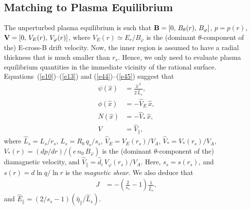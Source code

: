 \documentclass[12pt,prb,aps,notitlepage]{revtex4-1}
\begin{document}
\subsection{Matching to Plasma Equilibrium}
The unperturbed plasma equilibrium is such that
${\bf B} = [0,\,B_\theta(r),\,B_\varphi]$,  $p = p(r)$,
${\bf V} = [0,\,V_E(r),\,V_\varphi(r)]$,
where 
$V_E(r)\simeq E_r/B_\varphi$
 is the (dominant $\theta$-component of the) E-cross-B drift velocity. Now, the inner region is assumed to have a radial thickness that is
much smaller than $r_s$.   Hence, we only need to evaluate plasma equilibrium quantities in the immediate vicinity of the rational
surface. Equations~(\ref{e10})--(\ref{e13}) and (\ref{e44})--(\ref{e45}) suggest that 
\begin{align}
\psi(\hat{x})&= \frac{\hat{x}^{\,2}}{2\,\hat{L}_s},\label{e23}\\[0.5ex]
\phi(\hat{x}) &= - \hat{V}_E\,\hat{x},\\[0.5ex]
N(\hat{x}) &= -\hat{V}_\ast\,\hat{x},\\[0.5ex]
V &= \hat{V}_\parallel,\label{e26}
\end{align}
where 
 $\hat{L}_s=L_s/r_s$,  $L_s=R_0\,q_s/s_s$, 
  $\hat{V}_E= V_E(r_s)/V_A$,
$\hat{V}_\ast= V_\ast(r_s)/V_A$,
$V_\ast(r) = (dp/dr)/(e\,n_0\,B_\varphi)$ 
is the (dominant $\theta$-component of the) diamagnetic velocity,
  and 
 $\hat{V}_\parallel=\hat{d}_i\, V_\varphi(r_s)/V_A$. Here, $s_s=s(r_s)$, and $s(r)=d\ln q/\ln r$ is the {\em magnetic shear}.  We also deduce that 
 \begin{align}\label{e28}
 J &= -\left(\frac{2}{s_s}-1\right)\frac{1}{\hat{L}_s},
\end{align} 
and $ \hat{E}_\parallel =(2/s_s-1) (\hat{\eta}_\parallel/\hat{L}_s)$.
\end{document}
